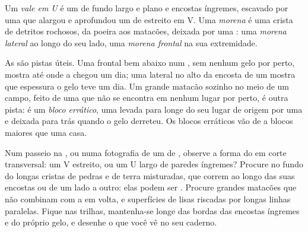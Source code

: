 \begin{definition}\label{def:g8:ice-on-earth:glacial-landforms}
Um \emph{vale em U} é um  de fundo largo e plano e encostas íngremes,
escavado por uma  que alargou e aprofundou um  de  estreito
em V. Uma \emph{morena} é uma crista de detritos rochosos, da poeira aos
matacões, deixada por uma : uma \emph{morena lateral} ao longo do
seu lado, uma \emph{morena frontal} na sua extremidade.
\end{definition}

As  são pistas úteis. Uma  frontal bem abaixo num , sem
nenhum gelo por perto, mostra até onde a  chegou um dia; uma
 lateral no alto da encosta de um  mostra que espessura o gelo
teve um dia. Um grande matacão sozinho no meio de um campo, feito de uma
 que não se encontra em nenhum lugar por perto, é outra pista: é um
\emph{bloco errático}, uma  levada para longe do seu lugar de origem
por uma  e deixada para trás quando o gelo derreteu. Os blocos
erráticos vão de  a blocos maiores que uma casa.

\begin{inthefield}
Num passeio na , ou numa fotografia de um  de ,
observe a forma do  em corte transversal: um V estreito, ou um U largo
de paredes íngremes? Procure no fundo do  longas cristas de pedras e
de terra misturadas, que correm ao longo das suas encostas ou de um lado a
outro: elas podem ser . Procure grandes matacões que não combinam
com a  em volta, e superfícies de  lisas riscadas por longas
linhas paralelas. Fique nas trilhas, mantenha-se longe das bordas das
encostas íngremes e do próprio gelo, e desenhe o que você vê no seu
caderno.
\end{inthefield}

